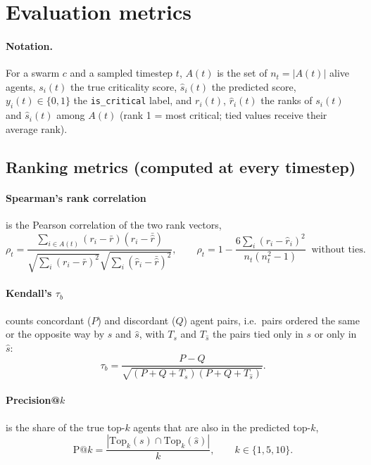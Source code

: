 \documentclass[11pt,a4paper]{article}
\begin{document}
\section{Evaluation metrics}\label{app:metrics}
\paragraph{Notation.} For a swarm $c$ and a sampled timestep $t$, $A(t)$ is the set of $n_t=|A(t)|$ alive agents, $s_i(t)$ the true
criticality score, $\hat s_i(t)$ the predicted score, $y_i(t)\in\{0,1\}$ the \texttt{is\_critical} label, and $r_i(t)$, $\hat r_i(t)$ the
ranks of $s_i(t)$ and $\hat s_i(t)$ among $A(t)$ (rank 1 = most critical; tied values receive their average rank).

\subsection*{Ranking metrics (computed at every timestep)}
\paragraph{Spearman's rank correlation} is the Pearson correlation of the two rank vectors,
\begin{equation}
\rho_t=\frac{\sum_{i\in A(t)}(r_i-\bar r)(\hat r_i-\bar{\hat r})}{\sqrt{\sum_{i}(r_i-\bar r)^2}\sqrt{\sum_{i}(\hat r_i-\bar{\hat r})^2}},
\qquad \rho_t=1-\frac{6\sum_i(r_i-\hat r_i)^2}{n_t(n_t^2-1)}\ \text{ without ties}.
\end{equation}
\paragraph{Kendall's $\tau_b$} counts concordant ($P$) and discordant ($Q$) agent pairs, i.e.\ pairs ordered the same or the opposite way by
$s$ and $\hat s$, with $T_s$ and $T_{\hat s}$ the pairs tied only in $s$ or only in $\hat s$:
\begin{equation}
\tau_b=\frac{P-Q}{\sqrt{(P+Q+T_s)(P+Q+T_{\hat s})}}.
\end{equation}
\paragraph{Precision@$k$} is the share of the true top-$k$ agents that are also in the predicted top-$k$,
\begin{equation}
\mathrm{P@}k=\frac{|\mathrm{Top}_k(s)\cap\mathrm{Top}_k(\hat s)|}{k},\qquad k\in\{1,5,10\}.
\end{equation}
\end{document}
